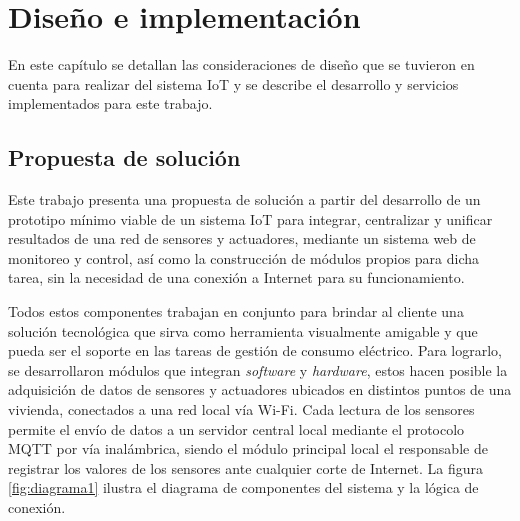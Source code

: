 \chapter{Diseño e implementación} %

\label{Chapter3} %

En este capítulo se detallan las consideraciones de diseño que se tuvieron en cuenta
para realizar del sistema IoT y se describe el desarrollo y servicios implementados para este trabajo.




\section{Propuesta de solución}

Este trabajo presenta una propuesta de solución a partir del desarrollo de un prototipo mínimo viable de un sistema IoT para integrar, centralizar y unificar resultados de una red de sensores y actuadores, mediante un sistema web de monitoreo y control, así como la construcción de módulos propios para dicha tarea, sin la necesidad de una conexión a Internet para su funcionamiento. 

Todos estos componentes trabajan en conjunto para brindar al cliente una solución tecnológica que sirva como herramienta visualmente amigable y que pueda ser el soporte en las tareas de gestión de consumo eléctrico. Para lograrlo, se desarrollaron módulos que integran \emph{software} y \emph{hardware}, estos hacen posible la adquisición de datos de sensores y actuadores ubicados en distintos puntos de una vivienda, conectados a una red local vía Wi-Fi. Cada lectura de los sensores permite el envío de datos a un servidor central local mediante el protocolo MQTT por vía inalámbrica, siendo el módulo principal local el responsable de registrar los valores de los sensores ante cualquier corte de Internet. La figura \ref{fig:diagrama1} ilustra el diagrama de componentes del sistema y la lógica de conexión.


